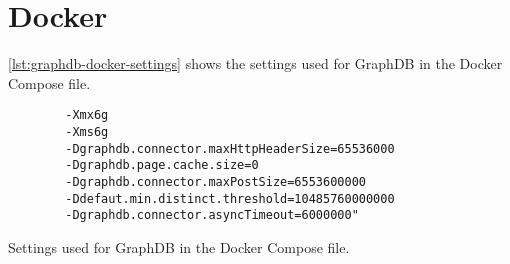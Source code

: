 \section{Docker}\label{sec:docker}
\autoref{lst:graphdb-docker-settings} shows the settings used for GraphDB in the Docker Compose file.

\begin{listing}[htb!]
    \begin{verbatim}
        -Xmx6g
        -Xms6g 
        -Dgraphdb.connector.maxHttpHeaderSize=65536000 
        -Dgraphdb.page.cache.size=0 
        -Dgraphdb.connector.maxPostSize=6553600000 
        -Ddefaut.min.distinct.threshold=10485760000000 
        -Dgraphdb.connector.asyncTimeout=6000000"        
    \end{verbatim}
    \caption{Settings used for GraphDB in the Docker Compose file.}
    \label{lst:graphdb-docker-settings}
\end{listing}
